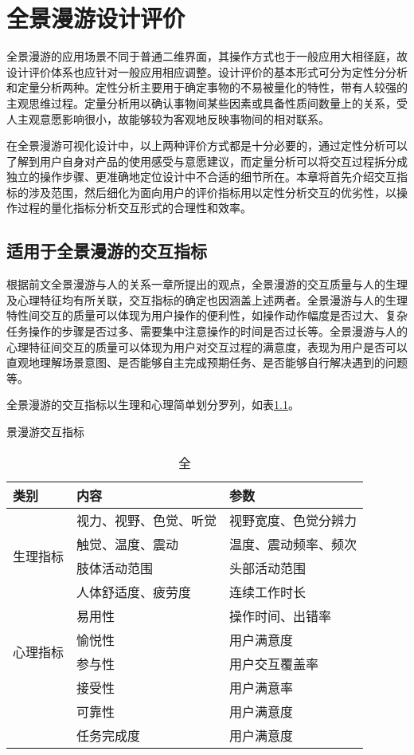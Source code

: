 \chapter{全景漫游设计评价}

全景漫游的应用场景不同于普通二维界面，其操作方式也于一般应用大相径庭，故设计评价体系也应针对一般应用相应调整。设计评价的基本形式可分为定性分分析和定量分析两种。定性分析主要用于确定事物的不易被量化的特性，带有人较强的主观思维过程。定量分析用以确认事物间某些因素或具备性质间数量上的关系，受人主观意愿影响很小，故能够较为客观地反映事物间的相对联系。

在全景漫游可视化设计中，以上两种评价方式都是十分必要的，通过定性分析可以了解到用户自身对产品的使用感受与意愿建议，而定量分析可以将交互过程拆分成独立的操作步骤、更准确地定位设计中不合适的细节所在。本章将首先介绍交互指标的涉及范围，然后细化为面向用户的评价指标用以定性分析交互的优劣性，以操作过程的量化指标分析交互形式的合理性和效率。

\section{适用于全景漫游的交互指标}
根据前文全景漫游与人的关系一章所提出的观点，全景漫游的交互质量与人的生理及心理特征均有所关联，交互指标的确定也因涵盖上述两者。全景漫游与人的生理特性间交互的质量可以体现为用户操作的便利性，如操作动作幅度是否过大、复杂任务操作的步骤是否过多、需要集中注意操作的时间是否过长等。全景漫游与人的心理特征间交互的质量可以体现为用户对交互过程的满意度，表现为用户是否可以直观地理解场景意图、是否能够自主完成预期任务、是否能够自行解决遇到的问题等。

全景漫游的交互指标以生理和心理简单划分罗列，如表\ref{tab:interaction}。

\begin{table}[htp]
\centering
\caption 全景漫游交互指标
\vskip 5pt
\begin{tabular}{lll}
\toprule
类别 & 内容 & 参数\\
\midrule
\multirow{4}{*}{生理指标} & 视力、视野、色觉、听觉 & 视野宽度、色觉分辨力 	\\
& 触觉、温度、震动 & 温度、震动频率、频次 \\
& 肢体活动范围 & 头部活动范围 \\
& 人体舒适度、疲劳度 & 连续工作时长 \\
\midrule
\multirow{4}{*}{心理指标} & 易用性 & 操作时间、出错率 \\
& 愉悦性 & 用户满意度  \\
& 参与性 & 用户交互覆盖率  \\
& 接受性 & 用户满意率  \\
& 可靠性 & 用户满意度  \\
& 任务完成度 & 用户满意度  \\
\bottomrule
\end{tabular}
\label{tab:interaction}
\end{table}

